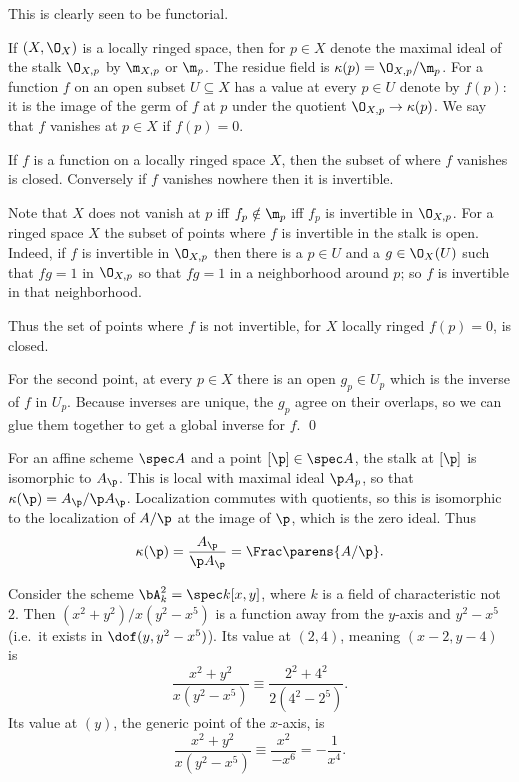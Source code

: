 This is clearly seen to be functorial.

\bdefn

    If $(X,\O_X)$ is a locally ringed space, then for $p\in X$ denote the maximal ideal of the stalk $\O_{X,p}$ by
    $\m_{X,p}$ or $\m_p$.
    The {\emphcolor residue field} is $\kappa(p)=\O_{X,p}/\m_p$.
    For a function $f$ on an open subset $U\subseteq X$ has a value at every $p\in U$ denote by $f(p)$: it is the image of
    the germ of $f$ at $p$ under the quotient $\O_{X,p}\to\kappa(p)$.
    We say that $f$ {\emphcolor vanishes} at $p\in X$ if $f(p)=0$.

\edefn

\bprop[name={sectionvanishingset}]

    If $f$ is a function on a locally ringed space $X$, then the subset of where $f$ vanishes is closed.
    Conversely if $f$ vanishes nowhere then it is invertible.

\eprop

\bproof

    Note that $X$ does not vanish at $p$ iff $f_p\notin\m_p$ iff $f_p$ is invertible in $\O_{X,p}$.
    For a ringed space $X$ the subset of points where $f$ is invertible in the stalk is open.
    Indeed, if $f$ is invertible in $\O_{X,p}$ then there is a $p\in U$ and a $g\in\O_X(U)$ such that $fg=1$ in $\O_{X,p}$
    so that $fg=1$ in a neighborhood around $p$; so $f$ is invertible in that neighborhood.

    Thus the set of points where $f$ is not invertible, for $X$ locally ringed $f(p)=0$, is closed.

    For the second point, at every $p\in X$ there is an open $g_p\in U_p$ which is the inverse of $f$ in $U_p$.
    Because inverses are unique, the $g_p$ agree on their overlaps, so we can glue them together to get a global inverse for
    $f$.
    \qed

\eproof

For an affine scheme $\spec A$ and a point $[\p]\in\spec A$, the stalk at $[\p]$ is isomorphic to $A_\p$.
This is local with maximal ideal $\p A_p$, so that $\kappa(\p)=A_\p/\p A_\p$.
Localization commutes with quotients, so this is isomorphic to the localization of $A/\p$ at the image of $\p$, which is the
zero ideal.
Thus
$$ \kappa(\p) = \frac{A_\p}{\p A_\p} = \Frac\parens{A/\p} . $$

\bexam

    Consider the scheme $\bA^2_k=\spec k[x,y]$, where $k$ is a field of characteristic not $2$.
    Then $(x^2+y^2)/x(y^2-x^5)$ is a function away from the $y$-axis and $y^2-x^5$ (i.e.\ it exists in $\dof(y,y^2-x^5)$).
    Its value at $(2,4)$, meaning $(x-2,y-4)$ is
    $$ \frac{x^2+y^2}{x(y^2-x^5)} \equiv \frac{2^2+4^2}{2(4^2-2^5)} . $$
    Its value at $(y)$, the generic point of the $x$-axis, is
    $$ \frac{x^2+y^2}{x(y^2-x^5)} \equiv \frac{x^2}{-x^6} = -\frac1{x^4} . $$

